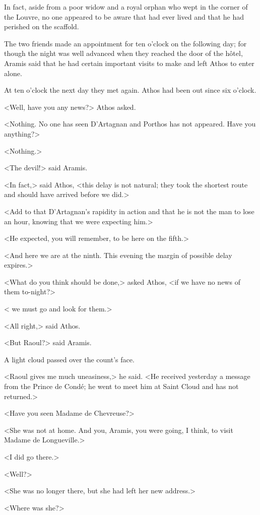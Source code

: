 In fact, aside from a poor widow and a royal orphan who wept in the corner of the Louvre, no one appeared to be aware that   had ever lived and that he had perished on the scaffold.

The two friends made an appointment for ten o'clock on the following day; for though the night was well advanced when they reached the door of the hôtel, Aramis said that he had certain important visits to make and left Athos to enter alone.

At ten o'clock the next day they met again. Athos had been out since six o'clock.

<Well, have you any news?> Athos asked.

<Nothing. No one has seen D'Artagnan and Porthos has not appeared. Have you anything?>

<Nothing.>

<The devil!> said Aramis.

<In fact,> said Athos, <this delay is not natural; they took the shortest route and should have arrived before we did.>

<Add to that D'Artagnan's rapidity in action and that he is not the man to lose an hour, knowing that we were expecting him.>

<He expected, you will remember, to be here on the fifth.>

<And here we are at the ninth. This evening the margin of possible delay expires.>

<What do you think should be done,> asked Athos, <if we have no news of them to-night?>

< we must go and look for them.>

<All right,> said Athos.

<But Raoul?> said Aramis.

A light cloud passed over the count's face.

<Raoul gives me much uneasiness,> he said. <He received yesterday a message from the Prince de Condé; he went to meet him at Saint Cloud and has not returned.>

<Have you seen Madame de Chevreuse?>

<She was not at home. And you, Aramis, you were going, I think, to visit Madame de Longueville.>

<I did go there.>

<Well?>

<She was no longer there, but she had left her new address.>

<Where was she?>

